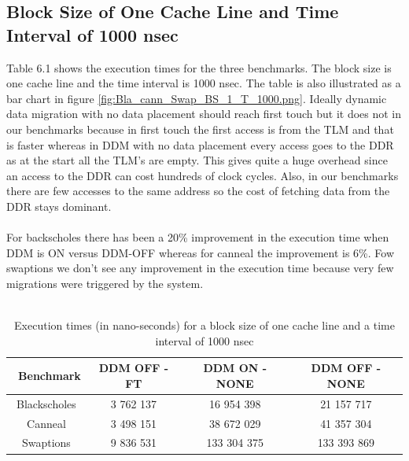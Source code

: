\documentclass{listhesis}
\begin{document}
\subsection{Block Size of One Cache Line and Time Interval of 1000 nsec}
Table 6.1 shows the execution times for the three benchmarks. The block size is one cache line and the time interval is 1000 nsec. The table is also illustrated as a bar chart in figure \ref{fig:Bla_cann_Swap_BS_1_T_1000.png}. Ideally dynamic data migration with no data placement should reach first touch but it does not in our benchmarks because in first touch the first access is from the TLM and that is faster whereas in DDM with no data placement every access goes to the DDR as at the start all the TLM's are empty. This gives quite a huge overhead since an access to the DDR can cost hundreds of clock cycles. Also, in our benchmarks there are few accesses to the same address so the cost of fetching data from the DDR stays dominant.\\
\\
For backscholes there has been a 20\% improvement in the execution time when DDM is ON versus DDM-OFF whereas for canneal the improvement is 6\%. Fow swaptions we don't see any improvement in the execution time because very few migrations were triggered by the system.\\
\\
\begin{table}[h!]
\begin{center}
 \begin{tabular}{|| c | c | c | c||} 
 \hline
 \ \textbf{Benchmark} & \textbf{DDM OFF - FT}  & \textbf{DDM ON - NONE}  & \textbf{DDM OFF - NONE}\\ [0.5 ex] 
 \hline\hline
  Blackscholes   &   3 762 137   &   16 954 398	    &  21 157 717 \\ 
 \hline
   Canneal  	&   3 498 151    &   38 672 029   	&   41 357 304   \\
 \hline
    Swaptions   &   9 836 531     &   133 304 375 	&   133 393 869   \\
 \hline
\end{tabular}
 \caption{Execution times (in nano-seconds) for a block size of one cache line and a time interval of 1000 nsec}
 \label{table:ExecTimes1}
\end{center}
\end{table}
\\
\end{document}
